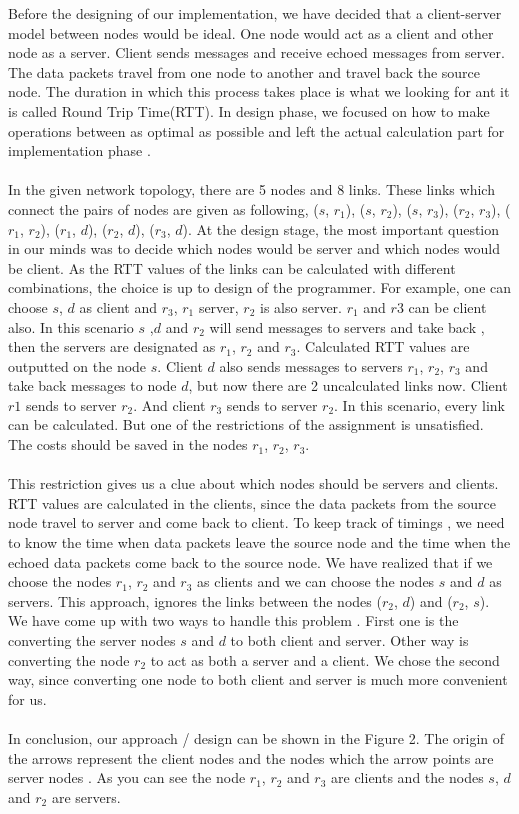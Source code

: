 \documentclass[conference]{IEEEtran}
\begin{document}
Before the designing of our implementation, we have decided that a client-server model between nodes would be ideal. One node would act as a client and other node as a server. Client sends messages and receive echoed messages from server. The data packets travel from one node to another and travel back the source node. The duration in which this process takes place is what we looking for ant it is called Round Trip Time(RTT). In design phase, we focused on how to make operations between as optimal as possible and left the actual calculation part for implementation phase . \\
\\
In the given network topology, there are 5 nodes and 8 links. These links which connect the pairs of nodes are given as following, ($s$, $r_1$), ($s$, $r_2$), ($s$, $r_3$), ($r_2$, $r_3$), ($r_1$, $r_2$), ($r_1$, $d$), ($r_2$, $d$), ($r_3$, $d$). At the design stage, the most important question in our minds was to decide which nodes would be  server and which nodes would be client. As the RTT values of the links can be calculated with different combinations, the choice is up to design of the programmer. For example, one can choose
$s$, $d$ as client and $r_3$, $r_1$ server, $r_2$ is also server. $r_1$ and $r3$ can be client also. In this scenario $s$ ,$d$ and $r_2$ will send messages to servers and take back , then the servers are designated as $r_1$, $r_2$ and $r_3$. Calculated RTT values are outputted on the node $s$. Client $d$ also sends messages to servers $r_1$, $r_2$, $r_3$ and take back messages to node $d$, but now there are 2 uncalculated links now. Client $r1$ sends to server $r_2$. And client $r_3$ sends to server $r_2$. In this scenario, every link can be calculated. But one of the restrictions of the assignment is unsatisfied. The costs should be saved in the nodes $r_1$, $r_2$, $r_3$. \\
\\
This restriction gives us a clue about which nodes should be servers and clients. RTT values are calculated in the clients, since the data packets from the source node travel to server and come back to client. To keep track of timings , we need to know the time when data packets leave the source node and the time when the echoed data packets come back to the source node. We have realized that if we choose the nodes $r_1$, $r_2$ and $r_3$ as clients and we can choose the nodes $s$ and $d$ as servers. This approach, ignores the links between the nodes ($r_2$, $d$) and ($r_2$, $s$). We have come up with two ways to handle this problem . First one is the converting the server nodes $s$ and $d$ to both client and server. Other way is converting the node $r_2$ to act as both a server and a client. We chose the second way, since converting one node to both client and server is much more convenient for us. \\
\\
In conclusion, our approach / design can be shown in the Figure 2. The origin of the arrows represent the client nodes and the nodes which the arrow points are server nodes . As you can see the node $r_1$, $r_2$ and $r_3$ are clients and the nodes $s$, $d$ and $r_2$ are servers. \\
\end{document}
